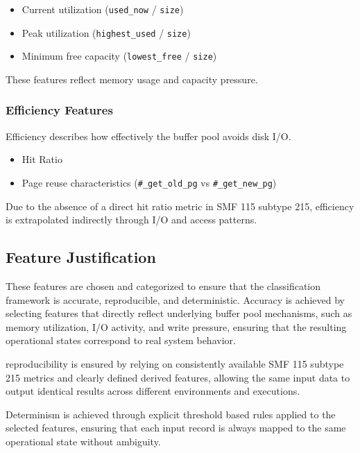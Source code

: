 \begin{itemize}
    \item Current utilization (\texttt{used\_now} / \texttt{size})
    \item Peak utilization (\texttt{highest\_used} / \texttt{size})
    \item Minimum free capacity (\texttt{lowest\_free} / \texttt{size})
\end{itemize}

These features reflect memory usage and capacity pressure.

\subsubsection{Efficiency Features}


Efficiency describes how effectively the buffer pool avoids disk I/O.

\begin{itemize}
    \item Hit Ratio
    \item Page reuse characteristics (\texttt{\#\_get\_old\_pg} vs \texttt{\#\_get\_new\_pg})
\end{itemize}

Due to the absence of a direct hit ratio metric in SMF 115 subtype 215, efficiency is extrapolated indirectly through I/O and access patterns.


\subsection{Feature Justification}

These features are chosen and categorized to ensure that the classification framework is accurate, reproducible, and deterministic. Accuracy is achieved by selecting features that directly reflect underlying buffer pool mechanisms, such as memory utilization, I/O activity, and write pressure, ensuring that the resulting operational states correspond to real system behavior.

reproducibility is ensured by relying on consistently available SMF 115 subtype 215 metrics and clearly defined derived features, allowing the same input data to output identical results across different environments and executions.

Determinism is achieved through explicit threshold based rules applied to the selected features, ensuring that each input record is always mapped to the same operational state without ambiguity.

